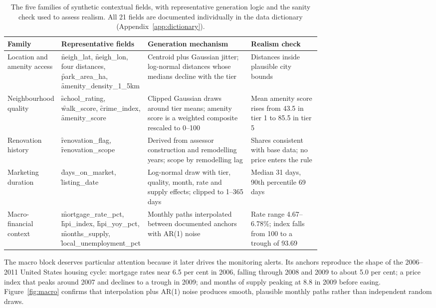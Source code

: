 \begin{table}[htbp]
\centering
\caption{The five families of synthetic contextual fields, with representative
generation logic and the sanity check used to assess realism. All 21 fields are
documented individually in the data dictionary (Appendix~\ref{app:dictionary}).}
\label{tab:synthetic}
\small
\begin{tabularx}{\linewidth}{@{}L{0.14\linewidth}L{0.255\linewidth}L{0.33\linewidth}X@{}}
\toprule
\textbf{Family} & \textbf{Representative fields} & \textbf{Generation mechanism} & \textbf{Realism check} \\
\midrule
Location and amenity access & \f{neigh\_lat}, \f{neigh\_lon}, four distances, \f{park\_area\_ha}, \f{amenity\_density\_1\_5km} & Centroid plus Gaussian jitter; log-normal distances whose medians decline with the tier & Distances inside plausible city bounds \\
Neighbourhood quality & \f{school\_rating}, \f{walk\_score}, \f{crime\_index}, \f{amenity\_score} & Clipped Gaussian draws around tier means; amenity score is a weighted composite rescaled to 0--100 & Mean amenity score rises from 43.5 in tier 1 to 85.5 in tier 5 \\
Renovation history & \f{renovation\_flag}, \f{renovation\_scope} & Derived from assessor construction and remodelling years; scope by remodelling lag & Shares consistent with base data; no price enters the rule \\
Marketing duration & \f{days\_on\_market}, \f{listing\_date} & Log-normal draw with tier, quality, month, rate and supply effects; clipped to 1--365 days & Median 31 days, 90th percentile 69 days \\
Macro-financial context & \f{mortgage\_rate\_pct}, \f{hpi\_index}, \f{hpi\_yoy\_pct}, \f{months\_supply}, \f{local\_unemployment\_pct} & Monthly paths interpolated between documented anchors with AR(1) noise & Rate range 4.67--6.78\%; index falls from 100 to a trough of 93.69 \\
\bottomrule
\end{tabularx}
\end{table}

The macro block deserves particular attention because it later drives the monitoring
alerts. Its anchors reproduce the shape of the 2006--2011 United States housing
cycle: mortgage rates near 6.5 per cent in 2006, falling through 2008 and 2009 to
about 5.0 per cent; a price index that peaks around 2007 and declines to a trough in
2009; and months of supply peaking at 8.8 in 2009 before easing.
Figure~\ref{fig:macro} confirms that interpolation plus AR(1) noise produces smooth,
plausible monthly paths rather than independent random draws.

